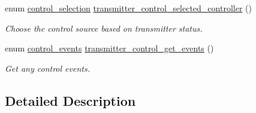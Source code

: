 \begin{DoxyCompactItemize}
enum \hyperlink{group___control_ga61438f5375f5e08187c7e12f13723afd}{control\-\_\-selection} \hyperlink{group___control_gacf816af6b4ab2c23707b55eb6b3281a0}{transmitter\-\_\-control\-\_\-selected\-\_\-controller} ()
\begin{DoxyCompactList}\small\item\em Choose the control source based on transmitter status. \end{DoxyCompactList}\item 
enum \hyperlink{group___control_ga6db279174b366abaad3f5de70b10655c}{control\-\_\-events} \hyperlink{group___control_ga51dc43f87515d8de90aebb1465578212}{transmitter\-\_\-control\-\_\-get\-\_\-events} ()
\begin{DoxyCompactList}\small\item\em Get any control events. \end{DoxyCompactList}\end{DoxyCompactItemize}


\subsection{Detailed Description}


